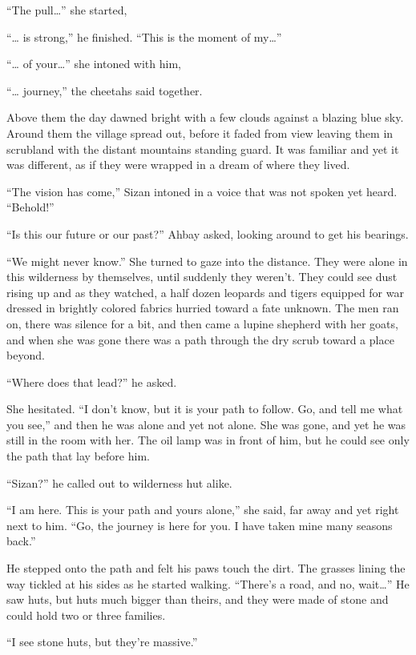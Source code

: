 ``The pull\ldots'' she started,

``\ldots{} is strong,'' he finished. ``This is the moment of my\ldots''

``\ldots{} of your\ldots'' she intoned with him,

``\ldots{} journey,'' the cheetahs said together.

Above them the day dawned bright with a few clouds against a blazing blue sky. Around them the village spread out, before it faded from view leaving them in scrubland with the distant mountains standing guard. It was familiar and yet it was different, as if they were wrapped in a dream of where they lived.

``The vision has come,'' Sizan intoned in a voice that was not spoken yet heard. ``Behold!''

``Is this our future or our past?'' Ahbay asked, looking around to get his bearings.

``We might never know.'' She turned to gaze into the distance. They were alone in this wilderness by themselves, until suddenly they weren't. They could see dust rising up and as they watched, a half dozen leopards and tigers equipped for war dressed in brightly colored fabrics hurried toward a fate unknown. The men ran on, there was silence for a bit, and then came a lupine shepherd with her goats, and when she was gone there was a path through the dry scrub toward a place beyond.

``Where does that lead?'' he asked.

She hesitated. ``I don't know, but it is your path to follow. Go, and tell me what you see,'' and then he was alone and yet not alone. She was gone, and yet he was still in the room with her. The oil lamp was in front of him, but he could see only the path that lay before him.

``Sizan?'' he called out to wilderness hut alike.

``I am here. This is your path and yours alone,'' she said, far away and yet right next to him. ``Go, the journey is here for you. I have taken mine many seasons back.''

He stepped onto the path and felt his paws touch the dirt. The grasses lining the way tickled at his sides as he started walking. ``There's a road, and no, wait\ldots'' He saw huts, but huts much bigger than theirs, and they were made of stone and could hold two or three families.

``I see stone huts, but they're massive.''

